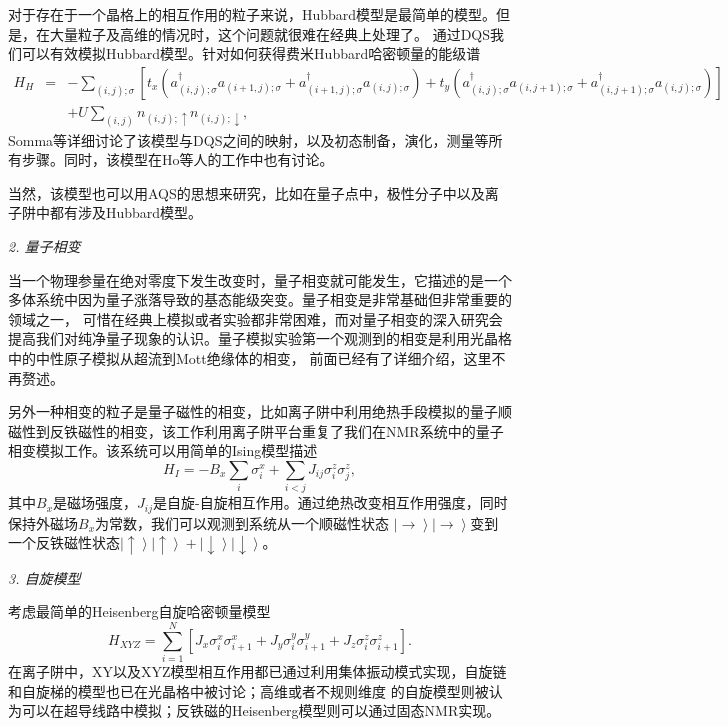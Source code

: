  对于存在于一个晶格上的相互作用的粒子来说，Hubbard模型是最简单的模型。但是，在大量粒子及高维的情况时，这个问题就很难在经典上处理了。
 通过DQS我们可以有效模拟Hubbard模型。针对如何获得费米Hubbard哈密顿量的能级谱
 \begin{eqnarray}\label{supersim}
 H_H &=& -\sum_{(i,j);\sigma}[t_x(a^{\dagger}_{(i,j);\sigma}a_{(i+1,j);\sigma}+a^{\dagger}_{(i+1,j);\sigma}a_{(i,j);\sigma})+t_y(a^{\dagger}_{(i,j);\sigma}a_{(i,j+1);\sigma}+a^{\dagger}_{(i,j+1);\sigma}a_{(i,j);\sigma})]\nonumber \\
 &&+U\sum_{(i,j)}n_{(i,j);\uparrow} n_{(i,j);\downarrow},
\end{eqnarray}
Somma等详细讨论了该模型与DQS之间的映射，以及初态制备，演化，测量等所有步骤\cite{mea1}。同时，该模型在Ho等人的工作中也有讨论\cite{hubbard1}。

当然，该模型也可以用AQS的思想来研究，比如在量子点中\cite{dotsim2}，极性分子中\cite{polar3}以及离子阱\cite{ionsim4}中都有涉及Hubbard模型。

 \emph{2. 量子相变}

 当一个物理参量在绝对零度下发生改变时，量子相变就可能发生，它描述的是一个多体系统中因为量子涨落导致的基态能级突变。量子相变是非常基础但非常重要的领域之一，
 可惜在经典上模拟或者实验都非常困难，而对量子相变的深入研究会提高我们对纯净量子现象的认识。量子模拟实验第一个观测到的相变是利用光晶格中的中性原子模拟从超流到Mott绝缘体的相变\cite{mott}，
 前面已经有了详细介绍，这里不再赘述。

 另外一种相变的粒子是量子磁性的相变，比如离子阱中利用绝热手段模拟的量子顺磁性到反铁磁性的相变\cite{ionphase}，该工作利用离子阱平台重复了我们在NMR系统中的量子相变模拟工作\cite{nmrsim5}。该系统可以用简单的Ising模型描述
 \begin{equation}\label{supersim}
 H_I = -B_x\sum_i \sigma_i^x+\sum_{i<j}J_{ij}\sigma_i^z\sigma_j^z,
\end{equation}
其中$B_x$是磁场强度，$J_{ij}$是自旋-自旋相互作用。通过绝热改变相互作用强度，同时保持外磁场$B_x$为常数，我们可以观测到系统从一个顺磁性状态
$\left\vert \rightarrow \right\rangle \left\vert \rightarrow \right\rangle$变到一个反铁磁性状态$\left\vert \uparrow \right\rangle \left\vert\uparrow \right\rangle+\left\vert \downarrow \right\rangle \left\vert\downarrow \right\rangle$。

  \emph{3. 自旋模型}

 考虑最简单的Heisenberg自旋哈密顿量模型
  \begin{equation}\label{supersim}
 H_{XYZ} = \sum_{i=1}^N[J_x\sigma_i^x\sigma_{i+1}^x+J_y\sigma_i^y\sigma_{i+1}^y+J_z\sigma_i^z\sigma_{i+1}^z].
\end{equation}
在离子阱中，XY以及XYZ模型相互作用都已通过利用集体振动模式实现\cite{model1}，自旋链和自旋梯的模型也已在光晶格中被讨论\cite{model2}；高维或者不规则维度
的自旋模型则被认为可以在超导线路中模拟\cite{model3}；反铁磁的Heisenberg模型则可以通过固态NMR实现\cite{model4}。

